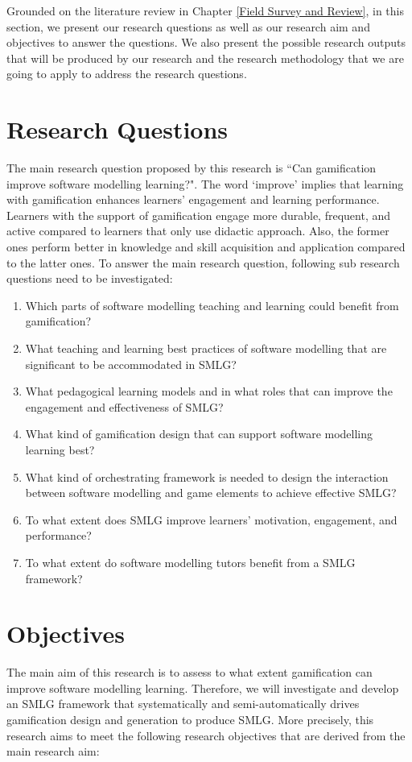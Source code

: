 \documentclass[12pt, a4paper]{report}
\begin{document}
Grounded on the literature review in Chapter \ref{Field Survey and Review}, in this section, we present our research questions as well as our research aim and objectives to answer the questions. We also present the possible research outputs that will be produced by our research and the research methodology that we are going to apply to address the research questions.   

\section{Research Questions}
The main research question proposed by this research is ``Can gamification
improve software modelling learning?". The word `improve' implies that learning
with gamification enhances learners' engagement and learning performance.
Learners with the support of gamification engage more durable, frequent, and
active compared to learners that only use didactic approach. Also, the former
ones perform better in knowledge and skill acquisition and application compared
to the latter ones. To answer the main research question, following sub research
questions need to be investigated:
\begin{enumerate}
\item Which parts of software modelling teaching and learning could benefit from gamification?
\item What teaching and learning best practices of software modelling that are significant to be accommodated in SMLG?
\item What pedagogical learning models and in what roles that can improve the engagement and effectiveness of SMLG?
\item What kind of gamification design that can support software modelling learning best? 
\item What kind of orchestrating framework is needed to design the interaction between software modelling and game elements to achieve effective SMLG?
\item To what extent does SMLG improve learners' motivation, engagement, and performance?
\item To what extent do software modelling tutors benefit from a SMLG framework?
\end{enumerate}

\section{Objectives}
\label{Objectives}
The main aim of this research is to assess to what extent gamification can improve software modelling learning. Therefore, we will investigate and develop an SMLG framework that systematically and semi-automatically drives gamification design and generation to produce SMLG. More precisely, this research aims to meet the following research objectives that are derived from the main research aim:
\end{document}
